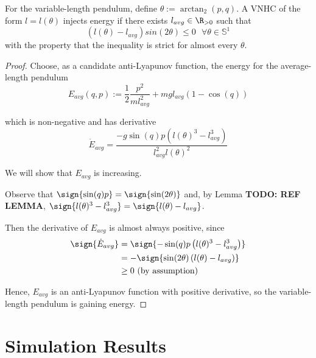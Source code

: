 \begin{thm}
For the variable-length pendulum, define \(\theta := \arctan_2(p,q)\). 
A VNHC of the form \(l = l(\theta)\) injects energy if there exists \(l_{avg} \in \R_{>0}\) such that
\[
   \left(l(\theta) - l_{avg}\right)sin(2\theta) \leq 0 \text{ }\forall \theta \in \mathbb{S}^1
\]
with the property that the inequality is strict for almost every \(\theta\).
\end{thm}
\begin{proof}
    Choose, as a candidate anti-Lyapunov function, the energy for the average-length pendulum 
    \[
       E_{avg}(q,p) := \frac{1}{2}\frac{p^2}{m l_{avg}^2} 
                    + m g l_{avg} (1-\cos(q))
    \]

    which is non-negative and has derivative 
    \[
      \dot{E}_{avg} = \frac{-g\sin(q)p \left(l(\theta)^3 - l_{avg}^3\right)}
                 {l_{avg}^2l(\theta)^2}
    \]

    We will show that \(E_{avg}\) is increasing.

    Observe that \(\sign{\sin(q)p} = \sign{\sin(2\theta)}\) and, 
    by Lemma \textbf{TODO: REF LEMMA},
    \( \sign{l(\theta)^3 - l_{avg}^3} 
     = \sign{ l(\theta) - l_{avg}}\). 

     Then the derivative of \(E_{avg}\) is almost always positive, since
     \begin{align*}
        \label{eq:}
        \sign{\dot{E}_{avg}} &= \sign{-\sin(q)p \left(l(\theta)^3 - l_{avg}^3\right)} \\
                    &= -\sign{\sin(2\theta) \left(l(\theta) - l_{avg}\right)} \\
                    &\geq 0 \text{ (by assumption)}
     \end{align*}

      Hence, \(E_{avg}\) is an anti-Lyapunov function with positive derivative,  
      so the variable-length pendulum is gaining energy.
\end{proof}

\section{Simulation Results}

